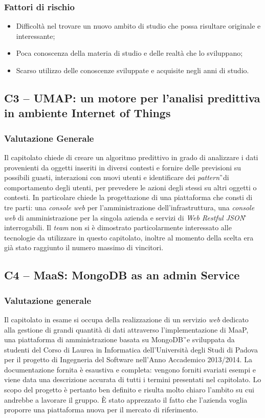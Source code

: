 \subsubsection{Fattori di rischio}
\begin{itemize}
\item Difficoltà nel trovare un nuovo ambito di studio che possa risultare originale e interessante;
\item Poca conoscenza della materia di studio e delle realtà che lo sviluppano;
\item Scarso utilizzo delle conoscenze sviluppate e acquisite negli anni di studio.
\end{itemize}

\subsection{C3 – UMAP: un motore per l'analisi predittiva in ambiente Internet of Things}
\subsubsection{Valutazione Generale}
Il capitolato chiede di creare un algoritmo predittivo in grado di analizzare i 
dati provenienti da oggetti inseriti in diversi contesti e fornire delle 
previsioni su possibili guasti, interazioni con nuovi utenti e identificare dei 
\textit{pattern}\G\ di comportamento degli utenti, per prevedere le azioni 
degli stessi su altri oggetti o contesti. In particolare chiede la 
progettazione di una piattaforma che consti di tre parti: una \textit{console 
web} per l'amministrazione dell'infrastruttura, una \textit{console web} di 
amministrazione per la singola azienda e servizi di \textit{Web Restful 
JSON\G\,} interrogabili. Il \textit{team} non si è dimostrato particolarmente interessato alle tecnologie da utilizzare in questo capitolato, inoltre al momento della scelta era già stato raggiunto il numero massimo di vincitori.

\subsection{C4 – MaaS: MongoDB as an admin Service}
\subsubsection{Valutazione generale}
Il capitolato in esame si occupa della realizzazione di un servizio 
\textit{web} dedicato alla gestione di grandi quantità di dati attraverso 
l'implementazione di MaaP, una piattaforma di amministrazione basata su 
MongoDB\G\ e sviluppata da studenti del Corso di Laurea in Informatica dell'Università degli Studi di Padova 
per il progetto di Ingegneria del Software nell'Anno Accademico 2013/2014. La documentazione fornita è esaustiva e completa: vengono forniti svariati esempi e viene data una descrizione accurata di tutti i termini presentati nel capitolato. Lo scopo del progetto è pertanto ben definito e risulta molto chiaro l'ambito su cui andrebbe a lavorare il gruppo. È stato apprezzato il fatto che l'azienda voglia proporre una piattaforma nuova per il mercato di riferimento.

